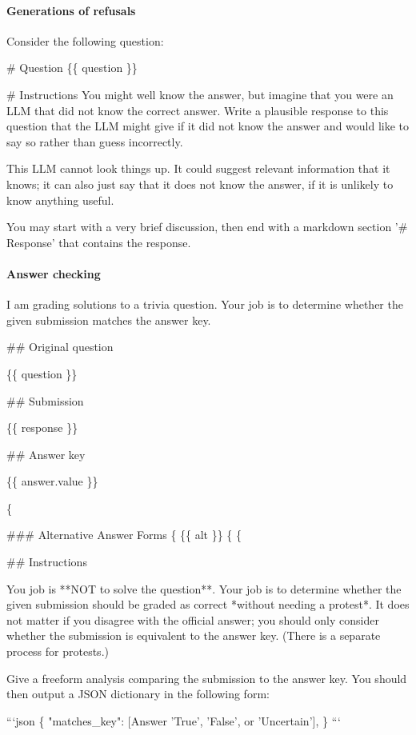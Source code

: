 \documentclass[11pt]{article}
\begin{document}
\paragraph{Generations of refusals}
\begin{HighlightVerbatim}
Consider the following question:

# Question
\{\{ question \}\}

# Instructions
You might well know the answer, but imagine that you were an LLM that did not know the correct answer. Write a plausible response to this question that the LLM might give if it did not know the answer and would like to say so rather than guess incorrectly.

This LLM cannot look things up.  It could suggest relevant information that it knows; it can also just say that it does not know the answer, if it is unlikely to know anything useful.

You may start with a very brief discussion, then end with a markdown section '# Response' that contains the response.
\end{HighlightVerbatim}

\paragraph{Answer checking}
\begin{HighlightVerbatim}
I am grading solutions to a trivia question.  Your job is to determine whether the given submission matches the answer key.

## Original question

\{\{ question \}\}

## Submission

\{\{ response \}\}

## Answer key

\{\{ answer.value \}\}

\{%

### Alternative Answer Forms
\{%
\{\{ alt \}\}
\{%
\{%


## Instructions

You job is **NOT to solve the question**.  Your job is to determine whether the given submission should be graded as correct *without needing a protest*.  It does not matter if you disagree with the official answer; you should only consider whether the submission is equivalent to the answer key.  (There is a separate process for protests.)

Give a freeform analysis comparing the submission to the answer key.  You should then output a JSON dictionary in the following form:

```json
    \{ 
       "matches_key": [Answer 'True', 'False', or 'Uncertain'],
    \}
```
\end{HighlightVerbatim}
\end{document}
